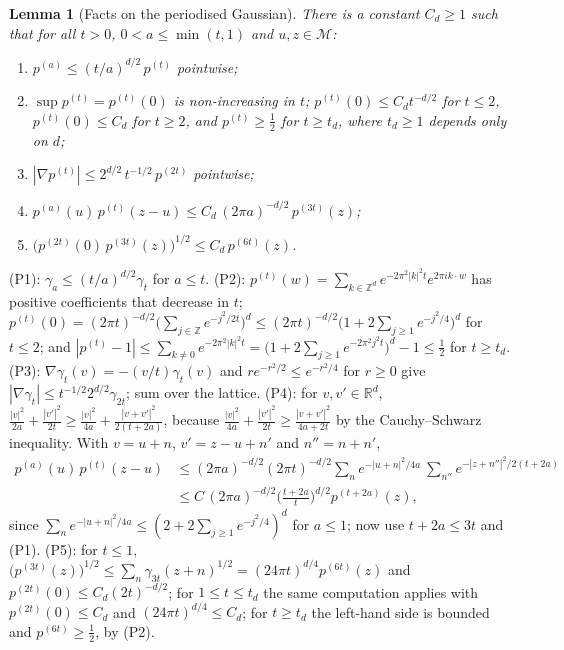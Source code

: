 \documentclass[11pt,a4paper]{article}
\makeatletter
\theoremstyle{stmt}
\newtheorem{lemma}[theorem]{Lemma}
\theoremstyle{defn}
\theoremstyle{rmk}
\renewenvironment{proof}[1][\proofname]{\par\pushQED{\qed}\normalfont\topsep6\p@\@plus6\p@\relax
  \trivlist\item[\hskip\labelsep{\sffamily\itshape\small #1.}]\ignorespaces}{\popQED\endtrivlist\@endpefalse}
\numberwithin{equation}{section}
\newcommand{\M}{\mathcal{M}}
\newcommand{\R}{\mathbb{R}}
\makeatother
\begin{document}
{\begin{lemma}[Facts on the periodised Gaussian]\label{lem:pgauss}
There is a constant $C_d\ge1$ such that for all $t>0$, $0<a\le\min(t,1)$ and $u,z\in\M$:
\begin{enumerate}[label=\textup{(P\arabic*)}]
\item $p^{(a)}\le(t/a)^{d/2}\,p^{(t)}$ pointwise;
\item $\sup p^{(t)}=p^{(t)}(0)$ is non-increasing in $t$; $p^{(t)}(0)\le C_dt^{-d/2}$ for $t\le2$, $p^{(t)}(0)\le C_d$ for $t\ge2$, and $p^{(t)}\ge\frac12$ for $t\ge t_d$, where $t_d\ge1$ depends only on $d$;
\item $|\nabla p^{(t)}|\le2^{d/2}\,t^{-1/2}\,p^{(2t)}$ pointwise;
\item $p^{(a)}(u)\,p^{(t)}(z-u)\le C_d\,(2\pi a)^{-d/2}\,p^{(3t)}(z)$;
\item $\big(p^{(2t)}(0)\,p^{(3t)}(z)\big)^{1/2}\le C_d\,p^{(6t)}(z)$.
\end{enumerate}
\end{lemma}

\begin{proof}
(P1): $\gamma_a\le(t/a)^{d/2}\gamma_t$ for $a\le t$. (P2): $p^{(t)}(w)=\sum_{k\in\mathbb Z^d}e^{-2\pi^2|k|^2t}e^{2\pi ik\cdot w}$ has positive coefficients that decrease in $t$; $p^{(t)}(0)=(2\pi t)^{-d/2}\big(\sum_{j\in\mathbb Z}e^{-j^2/2t}\big)^d\le(2\pi t)^{-d/2}\big(1+2\sum_{j\ge1}e^{-j^2/4}\big)^d$ for $t\le2$; and $|p^{(t)}-1|\le\sum_{k\ne0}e^{-2\pi^2|k|^2t}=\big(1+2\sum_{j\ge1}e^{-2\pi^2j^2t}\big)^d-1\le\frac12$ for $t\ge t_d$. (P3): $\nabla\gamma_t(v)=-(v/t)\gamma_t(v)$ and $re^{-r^2/2}\le e^{-r^2/4}$ for $r\ge0$ give $|\nabla\gamma_t|\le t^{-1/2}2^{d/2}\gamma_{2t}$; sum over the lattice. (P4): for $v,v'\in\R^d$, $\frac{|v|^2}{2a}+\frac{|v'|^2}{2t}\ge\frac{|v|^2}{4a}+\frac{|v+v'|^2}{2(t+2a)}$, because $\frac{|v|^2}{4a}+\frac{|v'|^2}{2t}\ge\frac{|v+v'|^2}{4a+2t}$ by the Cauchy--Schwarz inequality. With $v=u+n$, $v'=z-u+n'$ and $n''=n+n'$,
\[
\begin{aligned}
p^{(a)}(u)\,p^{(t)}(z-u)&\le(2\pi a)^{-d/2}(2\pi t)^{-d/2}\sum_ne^{-|u+n|^2/4a}\ \sum_{n''}e^{-|z+n''|^2/2(t+2a)}\\
&\le C\,(2\pi a)^{-d/2}\Big(\frac{t+2a}{t}\Big)^{d/2}p^{(t+2a)}(z),
\end{aligned}
\]
since $\sum_ne^{-|u+n|^2/4a}\le(2+2\sum_{j\ge1}e^{-j^2/4})^d$ for $a\le1$; now use $t+2a\le3t$ and (P1). (P5): for $t\le1$, $\big(p^{(3t)}(z)\big)^{1/2}\le\sum_n\gamma_{3t}(z+n)^{1/2}=(24\pi t)^{d/4}p^{(6t)}(z)$ and $p^{(2t)}(0)\le C_d(2t)^{-d/2}$; for $1\le t\le t_d$ the same computation applies with $p^{(2t)}(0)\le C_d$ and $(24\pi t)^{d/4}\le C_d$; for $t\ge t_d$ the left-hand side is bounded and $p^{(6t)}\ge\frac12$, by (P2).
\end{proof}

}
\end{document}
